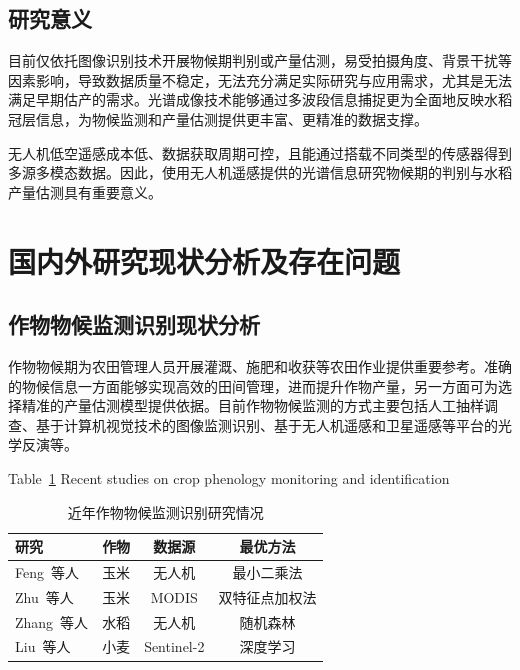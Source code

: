 \subsection{研究意义}
\label{subsec:significance}

目前仅依托图像识别技术开展物候期判别或产量估测，易受拍摄角度、背景干扰等因素影响，导致数据质量不稳定，无法充分满足实际研究与应用需求，尤其是无法满足早期估产的需求。光谱成像技术能够通过多波段信息捕捉更为全面地反映水稻冠层信息，为物候监测和产量估测提供更丰富、更精准的数据支撑。

无人机低空遥感成本低、数据获取周期可控，且能通过搭载不同类型的传感器得到多源多模态数据。因此，使用无人机遥感提供的光谱信息研究物候期的判别与水稻产量估测具有重要意义。

\section{国内外研究现状分析及存在问题}
\label{sec:literature}

\subsection{作物物候监测识别现状分析}
\label{subsec:phenology}

作物物候期为农田管理人员开展灌溉、施肥和收获等农田作业提供重要参考。准确的物候信息一方面能够实现高效的田间管理，进而提升作物产量，另一方面可为选择精准的产量估测模型提供依据\cite{ref2}。目前作物物候监测的方式主要包括人工抽样调查、基于计算机视觉技术的图像监测识别、基于无人机遥感和卫星遥感等平台的光学反演等。

\begin{table}[htbp]
  \centering
  \caption{近年作物物候监测识别研究情况}
  \label{tab:phenology_studies}
  \bigskip
  {\normalfont Table~\ref{tab:phenology_studies} Recent studies on crop phenology monitoring and identification}\\[4pt]
  \begin{tabular}{lccc}
    \toprule
    研究 & 作物 & 数据源 & 最优方法 \\
    \midrule
    Feng~等人 & 玉米 & 无人机 & 最小二乘法 \\
    Zhu~等人 & 玉米 & MODIS & 双特征点加权法 \\
    Zhang~等人 & 水稻 & 无人机 & 随机森林 \\
    Liu~等人 & 小麦 & Sentinel-2 & 深度学习 \\
    \bottomrule
  \end{tabular}
\end{table}

